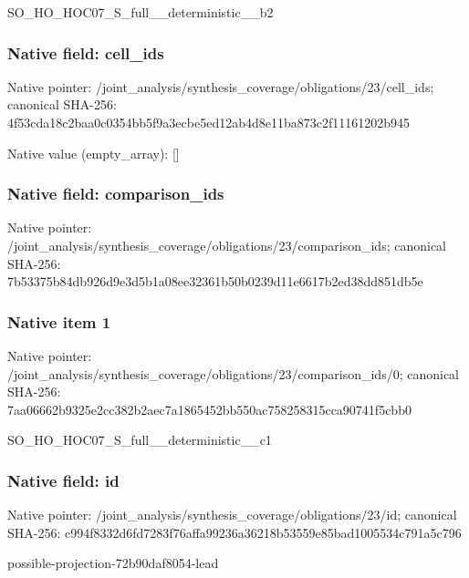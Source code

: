 \documentclass[10pt,a4paper]{article}
\begin{document}
\begingroup\raggedright\sloppy SO\_\allowbreak{}HO\_\allowbreak{}HOC07\_\allowbreak{}S\_\allowbreak{}full\_\allowbreak{}\_\allowbreak{}deterministic\_\allowbreak{}\_\allowbreak{}b2\par\endgroup

\subsubsection{Native field: cell\_\allowbreak{}ids}
Native pointer: /joint\_\allowbreak{}analysis/synthesis\_\allowbreak{}coverage/obligations/23/cell\_\allowbreak{}ids; canonical SHA-256: 4f53cda18c2baa0c0354bb5f9a3ecbe5ed12ab4d8e11ba873c2f11161202b945

Native value (empty\_\allowbreak{}array): []

\subsubsection{Native field: comparison\_\allowbreak{}ids}
Native pointer: /joint\_\allowbreak{}analysis/synthesis\_\allowbreak{}coverage/obligations/23/comparison\_\allowbreak{}ids; canonical SHA-256: 7b53375b84db926d9e3d5b1a08ee32361b50b0239d11e6617b2ed38dd851db5e

\subsubsection{Native item 1}
Native pointer: /joint\_\allowbreak{}analysis/synthesis\_\allowbreak{}coverage/obligations/23/comparison\_\allowbreak{}ids/0; canonical SHA-256: 7aa06662b9325e2cc382b2aec7a1865452bb550ac758258315cca90741f5cbb0

\begingroup\raggedright\sloppy SO\_\allowbreak{}HO\_\allowbreak{}HOC07\_\allowbreak{}S\_\allowbreak{}full\_\allowbreak{}\_\allowbreak{}deterministic\_\allowbreak{}\_\allowbreak{}c1\par\endgroup

\subsubsection{Native field: id}
Native pointer: /joint\_\allowbreak{}analysis/synthesis\_\allowbreak{}coverage/obligations/23/id; canonical SHA-256: c994f8332d6fd7283f76affa99236a36218b53559e85bad1005534c791a5c796

\begingroup\raggedright\sloppy possible-projection-72b90daf8054-lead\par\endgroup
\end{document}
